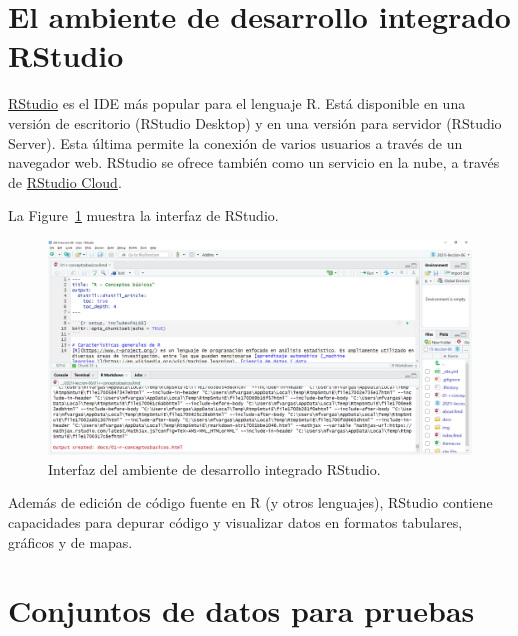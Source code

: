 \documentclass[
  letterpaper,
  DIV=11,
  numbers=noendperiod]{scrreprt}
\begin{document}
\hypertarget{el-ambiente-de-desarrollo-integrado-rstudio}{%
\section{El ambiente de desarrollo integrado
RStudio}\label{el-ambiente-de-desarrollo-integrado-rstudio}}

\href{https://www.rstudio.com/}{RStudio} es el IDE más popular para el
lenguaje R. Está disponible en una versión de escritorio (RStudio
Desktop) y en una versión para servidor (RStudio Server). Esta última
permite la conexión de varios usuarios a través de un navegador web.
RStudio se ofrece también como un servicio en la nube, a través de
\href{https://www.rstudio.com/products/cloud/}{RStudio Cloud}.

La Figure~\ref{fig-rstudio-interfaz} muestra la interfaz de RStudio.

\begin{figure}

{\centering \includegraphics[width=6.18in,height=\textheight]{./img/rstudio.png}

}

\caption{\label{fig-rstudio-interfaz}Interfaz del ambiente de desarrollo
integrado RStudio.}

\end{figure}

Además de edición de código fuente en R (y otros lenguajes), RStudio
contiene capacidades para depurar código y visualizar datos en formatos
tabulares, gráficos y de mapas.

\hypertarget{conjuntos-de-datos-para-pruebas}{%
\section{Conjuntos de datos para
pruebas}\label{conjuntos-de-datos-para-pruebas}}
\end{document}
